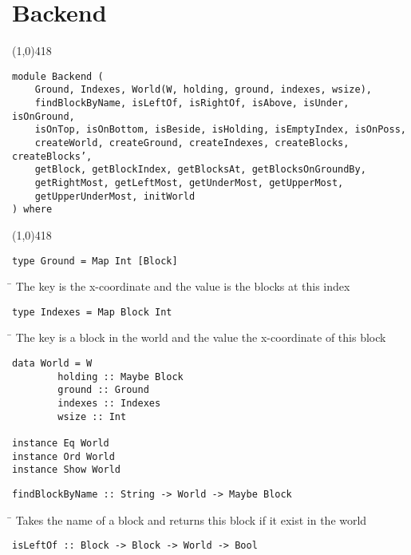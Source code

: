 \section{Backend}
\begin{center}
\line(1,0){418}
\end{center}
\begin{verbatim}
module Backend (
    Ground, Indexes, World(W, holding, ground, indexes, wsize),
    findBlockByName, isLeftOf, isRightOf, isAbove, isUnder, isOnGround,
    isOnTop, isOnBottom, isBeside, isHolding, isEmptyIndex, isOnPoss,
    createWorld, createGround, createIndexes, createBlocks, createBlocks’,
    getBlock, getBlockIndex, getBlocksAt, getBlocksOnGroundBy,
    getRightMost, getLeftMost, getUnderMost, getUpperMost,
    getUpperUnderMost, initWorld
) where
\end{verbatim}
\begin{center}
\line(1,0){418}
\end{center}
\begin{verbatim}
type Ground = Map Int [Block]
\end{verbatim}
\begin{tabbing}
\hspace*{1cm}\= \kill
\> The key is the x-coordinate and the value is the blocks at this index
\end{tabbing}
\begin{verbatim}
type Indexes = Map Block Int
\end{verbatim}
\begin{tabbing}
\hspace*{1cm}\= \kill
\> The key is a block in the world and the value the x-coordinate of this block
\end{tabbing}
\begin{verbatim}
data World = W 
        holding :: Maybe Block
        ground :: Ground
        indexes :: Indexes
        wsize :: Int

instance Eq World
instance Ord World
instance Show World
\end{verbatim}
\begin{verbatim}
findBlockByName :: String -> World -> Maybe Block
\end{verbatim}
\begin{tabbing}
\hspace*{1cm}\= \kill
\> Takes the name of a block and returns this block if it exist in the world
\end{tabbing}
\begin{verbatim}
isLeftOf :: Block -> Block -> World -> Bool
\end{verbatim}
